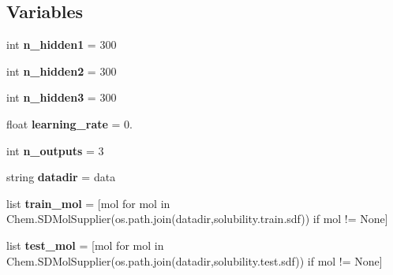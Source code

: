 \subsection*{Variables}
\begin{DoxyCompactItemize}
\item
\mbox{\label{namespacechemistry2quant_1_1chem2quant__NN_ad12d111be251ed83af451082bd45a2dc}}
int {\bfseries n\+\_\+hidden1} = 300
\item
\mbox{\label{namespacechemistry2quant_1_1chem2quant__NN_aa40ec150e2ce46aff8986fd5e4124ae8}}
int {\bfseries n\+\_\+hidden2} = 300
\item
\mbox{\label{namespacechemistry2quant_1_1chem2quant__NN_a2b7163491dd3dbe22fa62ac0b86a466e}}
int {\bfseries n\+\_\+hidden3} = 300
\item
\mbox{\label{namespacechemistry2quant_1_1chem2quant__NN_a018c556b422445320a2240a054ba7dc7}}
float {\bfseries learning\+\_\+rate} = 0.
\item
\mbox{\label{namespacechemistry2quant_1_1chem2quant__NN_ab66d41ca20104dd9e8662d8cfa52bf1f}}
int {\bfseries n\+\_\+outputs} = 3
\item
\mbox{\label{namespacechemistry2quant_1_1chem2quant__NN_afe2d119cffc5840ca31b1df221352f44}}
string {\bfseries datadir} = \textquotesingle{}data\textquotesingle{}
\item
\mbox{\label{namespacechemistry2quant_1_1chem2quant__NN_aaab99f2dc8ab9cd9758c58dcf76974e5}}
list {\bfseries train\+\_\+mol} = \mbox{[}mol for mol in Chem.\+S\+D\+Mol\+Supplier(os.\+path.\+join(datadir,\textquotesingle{}solubility.\+train.\+sdf\textquotesingle{})) if mol != None\mbox{]}
\item
\mbox{\label{namespacechemistry2quant_1_1chem2quant__NN_aa676e75d1cc9fd816d42a6e109716171}}
list {\bfseries test\+\_\+mol} = \mbox{[}mol for mol in Chem.\+S\+D\+Mol\+Supplier(os.\+path.\+join(datadir,\textquotesingle{}solubility.\+test.\+sdf\textquotesingle{})) if mol != None\mbox{]}

\end{DoxyCompactItemize}
